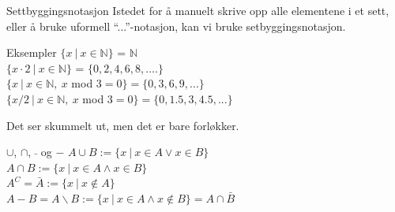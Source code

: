 \begin{frame}[fragile]{Settbyggingsnotasjon}
    Istedet for å manuelt skrive opp alle elementene i et sett, eller å bruke uformell \enquote{...}-notasjon, kan vi bruke setbyggingsnotasjon.
    \pause
    \begin{block}{Eksempler}
        $\{ x ~ | ~ x \in \mathbb{N}\}$ = $\mathbb{N}$\\
        \pause
        $\{ x \cdot 2 ~ | ~ x \in \mathbb{N}\}$ = $\{0, 2, 4, 6, 8, ....\}$\\
        \pause
        $\{x ~ | ~ x \in \mathbb{N}, ~ x$ mod $3 = 0 \} = \{0, 3, 6, 9, ...\}$\\
        \pause
        $\{x/2 ~ | ~ x \in \mathbb{N}, ~ x$ mod $3 = 0\} = \{0, 1.5, 3, 4.5, ...\}$
    \end{block}
    \pause
    Det ser skummelt ut, men det er bare forløkker.
\end{frame} 

\begin{frame}{$\cup$, $\cap$, $\bar{}$ og $-$}
    $A \cup B := \{x ~ | ~ x \in A \lor x \in B\}$ \\
    $A \cap B := \{x ~ | ~ x \in A \land x \in B\}$\\
    $A^C = \bar{A} := \{x ~ | ~ x \notin A\}$\\
    $A - B = A \backslash B := \{x ~ | ~ x \in A \land  x \notin B\} = A \cap \bar{B}$
    
    \begin{figure}%
        \centering
        \qquad
        \qquad
        \qquad
        \label{fig:example2}%
    \end{figure}
\end{frame}

